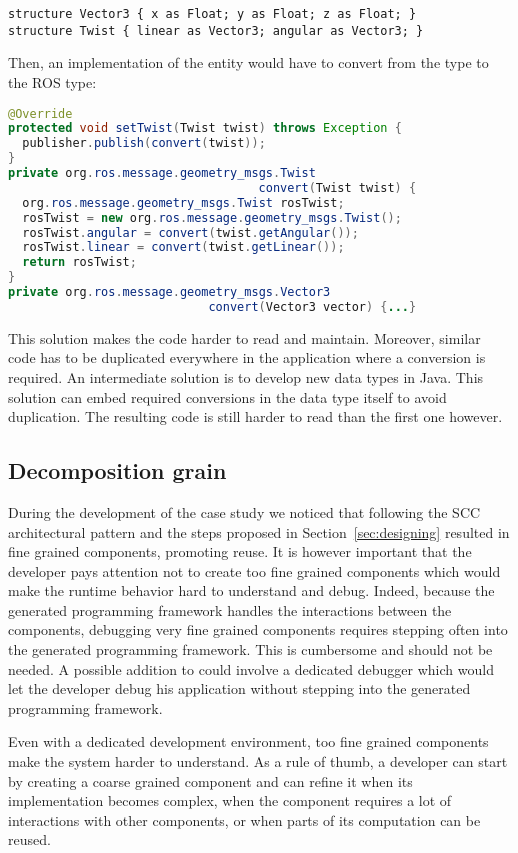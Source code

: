 \begin{lstlisting}[language=diaspec, numbers=none]
structure Vector3 { x as Float; y as Float; z as Float; }
structure Twist { linear as Vector3; angular as Vector3; }
\end{lstlisting}

Then, an implementation of the  entity would have to convert
from the \diaspec{}  type to the ROS  type:

\begin{lstlisting}[language=java, numbers=none]
@Override
protected void setTwist(Twist twist) throws Exception {
  publisher.publish(convert(twist));
}
private org.ros.message.geometry_msgs.Twist
                                   convert(Twist twist) {
  org.ros.message.geometry_msgs.Twist rosTwist;
  rosTwist = new org.ros.message.geometry_msgs.Twist();
  rosTwist.angular = convert(twist.getAngular());
  rosTwist.linear = convert(twist.getLinear());
  return rosTwist;
}
private org.ros.message.geometry_msgs.Vector3
                            convert(Vector3 vector) {...}
\end{lstlisting}

This solution makes the code harder to read and maintain. Moreover,
similar code has to be duplicated everywhere in the application where
a conversion is required. An intermediate solution is to develop new
data types in Java. This solution can embed required conversions in
the data type itself to avoid duplication. The resulting code is still
harder to read than the first one however.

\subsection{Decomposition grain}

During the development of the case study we noticed that following the
SCC architectural pattern and the steps proposed in
Section~\ref{sec:designing} resulted in fine grained components,
promoting reuse. It is however important that the developer pays
attention not to create too fine grained components which would make
the runtime behavior hard to understand and debug. Indeed, because the
generated programming framework handles the interactions between the
components, debugging very fine grained components requires stepping
often into the generated programming framework. This is cumbersome and
should not be needed. A possible addition to \diaspec{} could involve
a dedicated debugger which would let the developer debug his
application without stepping into the generated programming framework.

Even with a dedicated development environment, too fine grained
components make the system harder to understand. As a rule of thumb, a
developer can start by creating a coarse grained component and can
refine it when its implementation becomes complex, when the component
requires a lot of interactions with other components, or when parts
of its computation can be reused.

